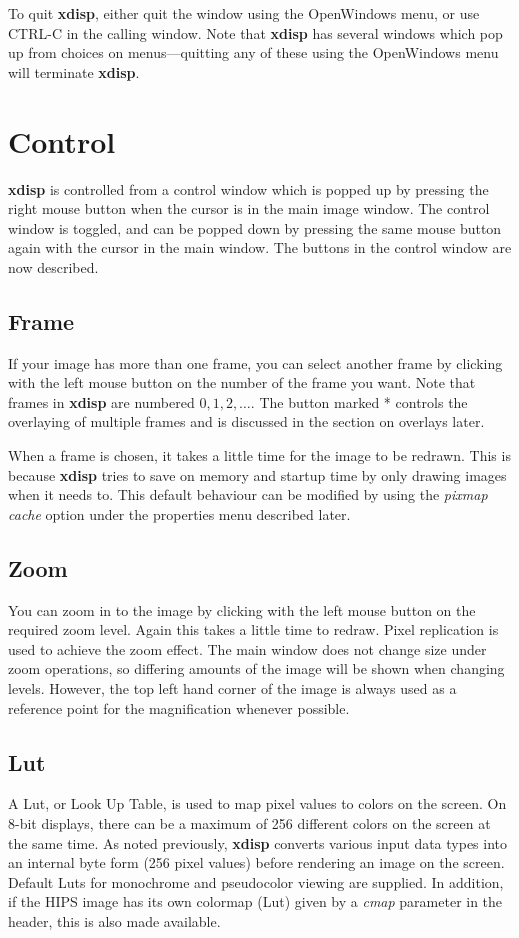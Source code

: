 To quit {\bf xdisp}, either quit the window using the OpenWindows menu, or use CTRL-C in the calling window. Note that {\bf xdisp} has several windows which pop up from choices on menus---quitting any of these using the OpenWindows menu will terminate {\bf xdisp}. 

\section{Control}
{\bf xdisp} is controlled from a control window which is popped up by pressing the right mouse button when the cursor is in the main image window. The control window is toggled, and can be popped down by pressing the same mouse button again with the cursor in the main window. The buttons in the control window are now described.

\subsection{Frame}
If your image has more than one frame, you can select another frame by clicking with the left mouse button on the number of the frame you want. Note that frames in {\bf xdisp} are numbered $0,1,2,\ldots$. The button marked * controls the overlaying of multiple frames and is discussed in the section on overlays later.

When a frame is chosen, it takes a little time for the image to be redrawn. This is because {\bf xdisp} tries to save on memory and startup time by only drawing images when it needs to. This default behaviour can be modified by using the {\it pixmap cache\/} option under the properties menu described later.

\subsection{Zoom}
You can zoom in to the image by clicking with the left mouse button on the required zoom level. Again this takes a little time to redraw. Pixel replication is used to achieve the zoom effect. The main window does not change size under zoom operations, so differing amounts of the image will be shown when changing levels. However, the top left hand corner of the image is always used as a reference point for the magnification whenever possible.

\subsection{Lut}
A Lut, or Look Up Table, is used to map pixel values to colors on the screen. On 8-bit displays, there can be a maximum of 256 different colors on the screen at the same time. As noted previously, {\bf xdisp} converts various input data types into an internal byte form (256 pixel values) before rendering an image on the screen. Default Luts for monochrome and pseudocolor viewing are supplied. In addition, if the HIPS image has its own colormap (Lut) given by a {\it cmap\/} parameter in the header, this is also made available. 


